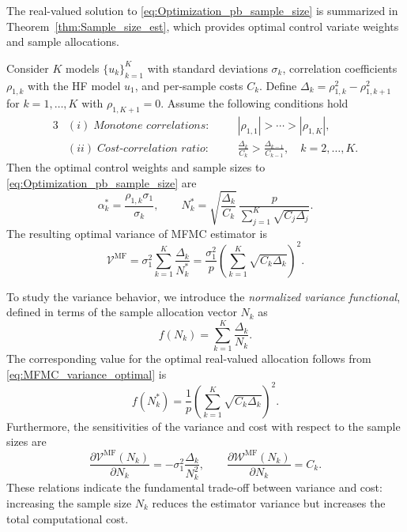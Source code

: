 %
The real-valued solution to \eqref{eq:Optimization_pb_sample_size} is summarized in Theorem~\ref{thm:Sample_size_est}, which provides optimal control variate weights and sample allocations.

\begin{theorem}\label{thm:Sample_size_est}
Consider $K$ models $\{u_{k}\}_{k=1}^K$ with standard deviations $\sigma_k$, correlation coefficients $\rho_{1,k}$ with the HF model $u_1$, and per-sample costs $C_k$. Define $\Delta_k = \rho_{1,k}^2 - \rho_{1,k+1}^2$ for $k = 1, \dots, K$ with $\rho_{1,K+1}=0$. Assume the following conditions hold
%
\begin{alignat*}{3}
&(i)\;\textit{Monotone correlations:} &\quad& |\rho_{1,1}| > \cdots > |\rho_{1,K}|,\\
&(ii)\;\textit{Cost-correlation ratio:} &\quad& \frac{\Delta_{k}}{C_k} > \frac{\Delta_{k-1}}{C_{k-1}}, \quad k=2,\ldots,K.
\end{alignat*}
%
Then the optimal control weights and sample sizes to \eqref{eq:Optimization_pb_sample_size} are
%
\begin{equation}\label{eq:MFMC_RealValued_Sample_Size}
    \alpha_k^* = \frac{\rho_{1,k}\sigma_1}{\sigma_k}, \qquad
    N_k^* = \sqrt{\frac{\Delta_k}{C_k}}\,
    \frac{p}{\sum_{j=1}^K \sqrt{C_j \Delta_j}}.
\end{equation}
%
%
The resulting optimal variance of MFMC estimator is
\begin{equation}\label{eq:MFMC_variance_optimal}
\mathcal{V}^{\text{MF}}
= \sigma_1^2\sum_{k=1}^K \frac{\Delta_k}{N_k^*}=\frac{\sigma_1^2}{p}\!\left(\sum_{k=1}^K \sqrt{C_k \Delta_k}\right)^{\!2}.
\end{equation}
\end{theorem}

To study the variance behavior, we introduce the {\it normalized variance functional}, defined in terms of the sample allocation vector $N_k$ as
\[
f(N_k) =\sum_{k=1}^K \frac{\Delta_k}{N_k}.
\]
The corresponding value for the optimal real-valued allocation follows from \eqref{eq:MFMC_variance_optimal} is
%
\[
f(N_k^*) = \frac{1}{p}\left(\sum_{k=1}^K\sqrt{C_k\Delta_k}\right)^2.
\]
%
Furthermore, the sensitivities of the variance and cost with respect to the sample sizes are
\[
\frac{\partial \mathcal{V}^{\text{MF}}(N_k)}{\partial N_k} = -\sigma_1^2\frac{\Delta_k}{N_k^2},
\qquad 
\frac{\partial \mathcal{W}^{\text{MF}}(N_k)}{\partial N_k} = C_k.
\]
These relations indicate the fundamental trade-off between variance and cost: increasing the sample size $N_k$ reduces the estimator variance but increases the total computational cost.




